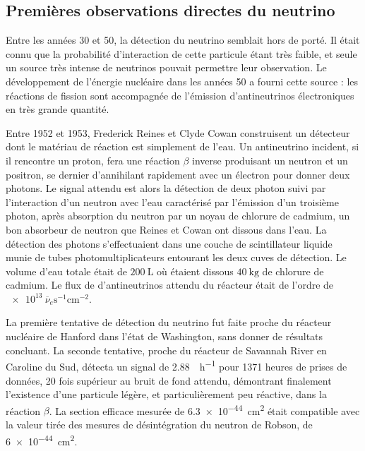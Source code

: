         \subsection{Premières observations directes du neutrino}
        
	        Entre les années 30 et 50, la détection du neutrino semblait hors de porté. Il était connu que la probabilité d'interaction de cette particule étant très faible, et seule un source très intense de neutrinos pouvait permettre leur observation. Le développement de l'énergie nucléaire dans les années 50 a fourni cette source : les réactions de fission sont accompagnée de l'émission d'antineutrinos électroniques en très grande quantité.
	        
	        Entre 1952 et 1953, Frederick Reines et Clyde Cowan construisent un détecteur dont le matériau de réaction est simplement de l'eau. Un antineutrino incident, si il rencontre un proton, fera une réaction $\beta$ inverse produisant un neutron et un positron, se dernier d'annihilant rapidement avec un électron pour donner deux photons. Le signal attendu est alors la détection de deux photon suivi par l'interaction d'un neutron avec l'eau caractérisé par l'émission d'un troisième photon, après absorption du neutron par un noyau de chlorure de cadmium, un bon absorbeur de neutron que Reines et Cowan ont dissous dans l'eau. La détection des photons s'effectuaient dans une couche de scintillateur liquide munie de tubes photomultiplicateurs entourant les deux cuves de détection. Le volume d'eau totale était de $\SI{200}{\liter}$ où étaient dissous $\SI{40}{\kilogram}$ de chlorure de cadmium. Le flux de d'antineutrinos attendu du réacteur était de l'ordre de $\SI{e13}{\overline{\nu}_e\second^{-1}\centi\meter^{-2}}$.
	    
		    La première tentative de détection du neutrino fut faite proche du réacteur nucléaire de Hanford dans l'état de Washington, sans donner de résultats concluant. La seconde tentative, proche du réacteur de Savannah River en Caroline du Sud, détecta un signal de \SI{2.88}{\per\hour}\cite{Cowan1956} pour 1371 heures de prises de données, 20 fois supérieur au bruit de fond attendu, démontrant finalement l'existence d'une particule légère, et particulièrement peu réactive, dans la réaction $\beta$. La section efficace mesurée de  \SI{6.3e-44}{\centi\meter\squared} était compatible avec la valeur tirée des mesures de désintégration du neutron de Robson\cite{Robson1951}, de \SI{6e-44}{\centi\meter\squared}.
		    

